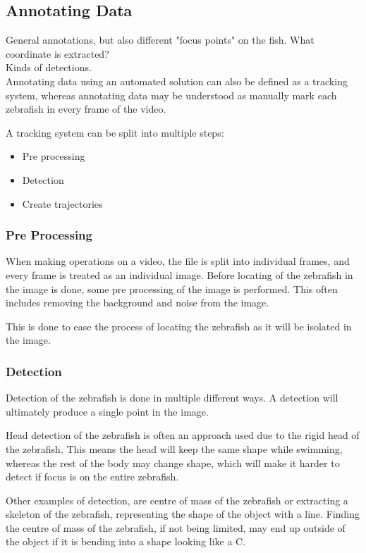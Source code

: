 \subsection{Annotating Data}
General annotations, but also different "focus points" on the fish. What coordinate is extracted?\\
Kinds of detections.\\

Annotating data using an automated solution can also be defined as a tracking system, whereas annotating data may be understood as manually mark each zebrafish in every frame of the video. 

A tracking system can be split into multiple steps:

\begin{itemize}
	\item Pre processing
	\item Detection
	\item Create trajectories
\end{itemize}

\subsubsection{Pre Processing}
When making operations on a video, the file is split into individual frames, and every frame is treated as an individual image. Before locating of the zebrafish in the image is done, some pre processing of the image is performed. This often includes removing the background and noise from the image.

This is done to ease the process of locating the zebrafish as it will be isolated in the image.

\subsubsection{Detection}
Detection of the zebrafish is done in multiple different ways. A detection will ultimately produce a single point in the image.

Head detection of the zebrafish is often an approach used due to the rigid head of the zebrafish. This means the head will keep the same shape while swimming, whereas the rest of the body may change shape, which will make it harder to detect if focus is on the entire zebrafish.

Other examples of detection, are centre of mass of the zebrafish or extracting a skeleton of the zebrafish, representing the shape of the object with a line. Finding the centre of mass of the zebrafish, if not being limited, may end up outside of the object if it is bending into a shape looking like a C.

